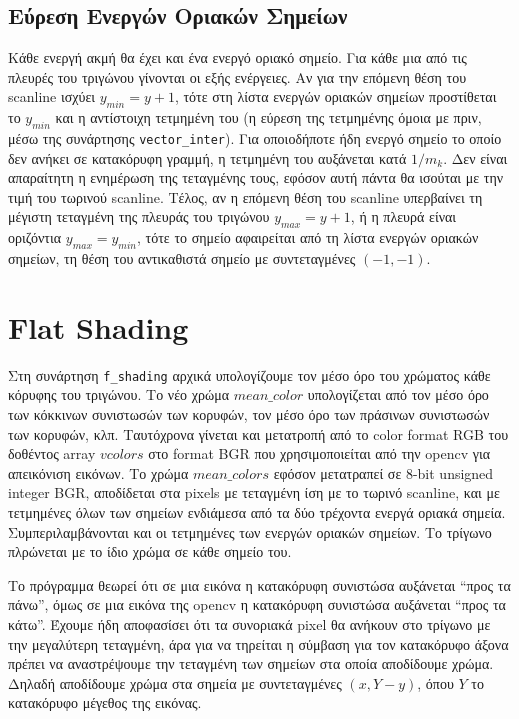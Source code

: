 \documentclass{article}
\begin{document}
\subsection{Εύρεση Ενεργών Οριακών Σημείων}
Κάθε ενεργή ακμή θα έχει και ένα ενεργό οριακό σημείο.
Για κάθε μια από τις πλευρές του τριγώνου γίνονται οι εξής ενέργειες.
Αν για την επόμενη θέση του scanline ισχύει $y_{min} = y + 1$, 
τότε στη λίστα ενεργών οριακών σημείων προστίθεται το $y_{min}$
και η αντίστοιχη τετμημένη του (η εύρεση της τετμημένης όμοια με 
πριν, μέσω της συνάρτησης \verb|vector_inter|). Για οποιοδήποτε 
ήδη ενεργό σημείο το οποίο δεν ανήκει σε κατακόρυφη γραμμή, η τετμημένη
του αυξάνεται κατά $1 / m_k$. Δεν είναι απαραίτητη η ενημέρωση 
της τεταγμένης τους, εφόσον αυτή πάντα θα ισούται με την τιμή του τωρινού scanline.
Τέλος, αν η επόμενη θέση του scanline υπερβαίνει τη μέγιστη τεταγμένη
της πλευράς του τριγώνου $y_{max} = y + 1$, ή η πλευρά είναι οριζόντια 
$y_{max} = y_{min}$, τότε το σημείο αφαιρείται από τη λίστα ενεργών
οριακών σημείων, τη θέση του αντικαθιστά σημείο με συντεταγμένες 
$(-1, -1)$.

\section{Flat Shading}
Στη συνάρτηση \verb|f_shading| αρχικά υπολογίζουμε τον μέσο όρο του χρώματος 
κάθε κόρυφης του τριγώνου. Το νέο χρώμα $mean\_color$ υπολογίζεται από 
τον μέσο όρο των κόκκινων συνιστωσών των κορυφών, τον μέσο όρο των 
πράσινων συνιστωσών των κορυφών, κλπ. Ταυτόχρονα γίνεται και μετατροπή 
από το color format RGB του δοθέντος array $vcolors$ στο format BGR
που χρησιμοποιείται από την opencv για απεικόνιση εικόνων. 
Το χρώμα $mean\_colors$ εφόσον μετατραπεί σε 8-bit unsigned integer
BGR, αποδίδεται στα pixels με τεταγμένη ίση με το τωρινό scanline,
και με τετμημένες όλων των σημείων ενδιάμεσα από τα δύο 
τρέχοντα ενεργά οριακά σημεία. Συμπεριλαμβάνονται και οι
τετμημένες των ενεργών οριακών σημείων. Το τρίγωνο πλρώνεται με το 
ίδιο χρώμα σε κάθε σημείο του.

Το πρόγραμμα θεωρεί ότι σε μια εικόνα η κατακόρυφη συνιστώσα αυξάνεται 
``προς τα πάνω'', όμως σε μια εικόνα της opencv η κατακόρυφη συνιστώσα
αυξάνεται ``προς τα κάτω''. Έχουμε ήδη αποφασίσει ότι τα συνοριακά pixel θα 
ανήκουν στο τρίγωνο με την μεγαλύτερη τεταγμένη, άρα για να τηρείται η 
σύμβαση για τον κατακόρυφο άξονα πρέπει να αναστρέψουμε την 
τεταγμένη των σημείων στα οποία αποδίδουμε χρώμα. Δηλαδή 
αποδίδουμε χρώμα στα σημεία με συντεταγμένες
$(x, Y - y)$, όπου $Y$ το κατακόρυφο μέγεθος της εικόνας.
\end{document}
